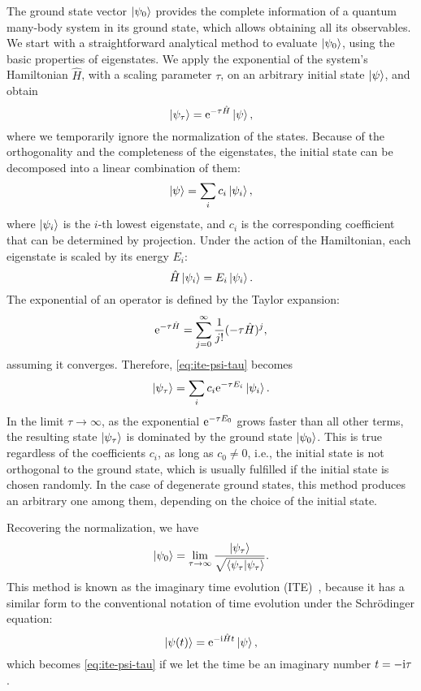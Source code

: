 The ground state vector $\ket{\psi_0}$ provides the complete information of a quantum many-body system in its ground state, which allows obtaining all its observables. We start with a straightforward analytical method to evaluate $\ket{\psi_0}$, using the basic properties of eigenstates. We apply the exponential of the system's Hamiltonian $\hat{H}$, with a scaling parameter $\tau$, on an arbitrary initial state $\ket{\psi}$, and obtain
\begin{equation}
\ket{\psi_\tau} = \mathrm{e}^{-\tau \hat{H}} \ket{\psi},
\label{eq:ite-psi-tau}
\end{equation}
where we temporarily ignore the normalization of the states. Because of the orthogonality and the completeness of the eigenstates, the initial state can be decomposed into a linear combination of them:
\begin{equation}
\ket{\psi} = \sum_i c_i \ket{\psi_i},
\end{equation}
where $\ket{\psi_i}$ is the $i$-th lowest eigenstate, and $c_i$ is the corresponding coefficient that can be determined by projection. Under the action of the Hamiltonian, each eigenstate is scaled by its energy $E_i$:
\begin{equation}
\hat{H} \ket{\psi_i} = E_i \ket{\psi_i}.
\end{equation}
The exponential of an operator is defined by the Taylor expansion:
\begin{equation}
\mathrm{e}^{-\tau \hat{H}} = \sum_{j = 0}^\infty \frac{1}{j!} (-\tau \hat{H})^j,
\label{eq:ite-taylor}
\end{equation}
assuming it converges. Therefore, \cref{eq:ite-psi-tau} becomes
\begin{equation}
\ket{\psi_\tau} = \sum_i c_i \mathrm{e}^{-\tau E_i} \ket{\psi_i}.
\end{equation}
In the limit $\tau \to \infty$, as the exponential $\mathrm{e}^{-\tau E_0}$ grows faster than all other terms, the resulting state $\ket{\psi_\tau}$ is dominated by the ground state $\ket{\psi_0}$. This is true regardless of the coefficients $c_i$, as long as $c_0 \neq 0$, i.e., the initial state is not orthogonal to the ground state, which is usually fulfilled if the initial state is chosen randomly. In the case of degenerate ground states, this method produces an arbitrary one among them, depending on the choice of the initial state.

Recovering the normalization, we have
\begin{equation}
\ket{\psi_0} = \lim_{\tau \to \infty} \frac{\ket{\psi_\tau}}{\sqrt{\ip{\psi_\tau}}}.
\label{eq:ite}
\end{equation}
This method is known as the imaginary time evolution (ITE)~\cite{goldberg1967integration}, because it has a similar form to the conventional notation of time evolution under the Schrödinger equation:
\begin{equation}
\ket{\psi(t)} = \mathrm{e}^{-\mathrm{i} \hat{H} t} \ket{\psi},
\end{equation}
which becomes \cref{eq:ite-psi-tau} if we let the time be an imaginary number $t = -\mathrm{i} \tau$.

